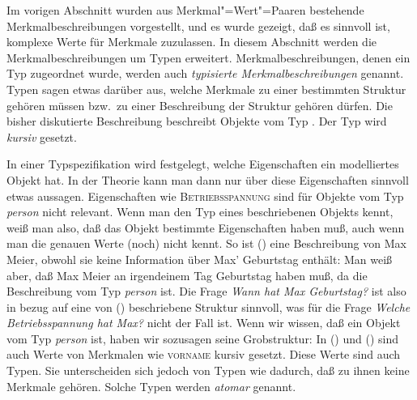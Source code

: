 Im vorigen Abschnitt wurden aus Merkmal"=Wert"=Paaren bestehende
Merkmalbeschreibungen vorgestellt, und es wurde gezeigt, daß es sinnvoll ist,
komplexe Werte für Merkmale zuzulassen.  In diesem Abschnitt werden die
Merkmalbeschreibungen um Typen erweitert. Merkmalbeschreibungen, denen ein Typ
zugeordnet wurde, werden auch \emph{typisierte Merkmalbeschreibungen} genannt.
Typen sagen etwas darüber aus, welche Merkmale zu einer
bestimmten Struktur gehören müssen bzw.\ zu einer Beschreibung der
Struktur gehören dürfen. Die bisher diskutierte Beschreibung beschreibt
Objekte vom Typ .
\ea
{}
\z
Der Typ wird \textit{kursiv} gesetzt. 

In einer Typspezifikation wird festgelegt, welche Eigenschaften ein modelliertes
Objekt hat. In der Theorie kann man dann nur über diese Eigenschaften sinnvoll etwas
aussagen. Eigenschaften wie \textsc{Betriebsspannung} sind für Objekte vom
Typ \textit{person} nicht relevant. Wenn man den Typ eines beschriebenen Objekts kennt,
weiß man also, daß das Objekt bestimmte Eigenschaften haben muß, auch wenn man
die genauen Werte (noch) nicht kennt. So ist () eine Beschreibung von
Max Meier, obwohl sie \zb keine Information über Max' Geburtstag enthält:
\ea
{}
\z
Man weiß aber, daß Max Meier an irgendeinem Tag Geburtstag haben muß, da die
Beschreibung vom Typ \textit{person} ist. Die Frage \emph{Wann hat Max Geburtstag?}
ist also in bezug auf eine von () beschriebene Struktur sinnvoll, was für die Frage
\emph{Welche Betriebsspannung hat Max?} nicht der Fall ist. Wenn wir wissen, daß ein Objekt vom Typ
\textit{person} ist, haben wir sozusagen seine Grobstruktur:
\ea
{}
\z
In () und () sind auch Werte von Merkmalen wie \textsc{vorname} kursiv gesetzt. Diese Werte sind auch
Typen. Sie unterscheiden sich jedoch von Typen wie  dadurch, daß zu ihnen keine
Merkmale gehören. Solche Typen werden \emph{atomar} genannt.

